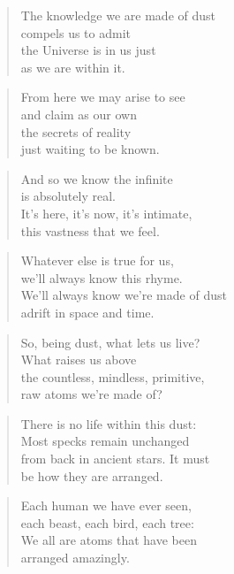 \documentclass[14pt,a4paper]{article}
\begin{document}
\begin{verse}
The knowledge we are made of dust\\
compels us to admit\\
the Universe is in us just\\
as we are within it.
\end{verse}

\begin{verse}
From here we may arise to see\\
and claim as our own\\
the secrets of reality\\
just waiting to be known.
\end{verse}

\begin{verse}
And so we know the infinite\\
is absolutely real.\\
It’s here, it’s now, it’s intimate,\\
this vastness that we feel.
\end{verse}

\begin{verse}
Whatever else is true for us,\\
we’ll always know this rhyme.\\
We’ll always know we’re made of dust\\
adrift in space and time.
\end{verse}


\begin{verse}
So, being dust, what lets us live?\\
What raises us above\\
the countless, mindless, primitive,\\
raw atoms we’re made of?
\end{verse}

\begin{verse}
There is no life within this dust:\\
Most specks remain unchanged\\
from back in ancient stars. It must\\
be how they are arranged.
\end{verse}

\begin{verse}
Each human we have ever seen,\\
each beast, each bird, each tree:\\
We all are atoms that have been\\
arranged amazingly.
\end{verse}
\end{document}
